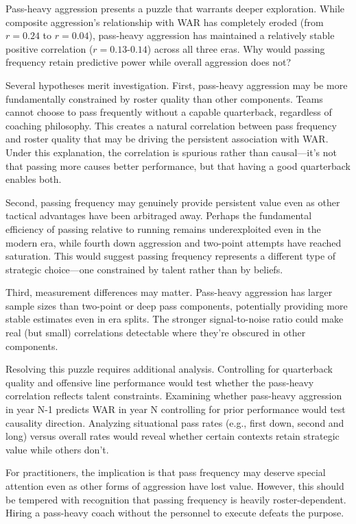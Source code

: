 \documentclass[11pt,twocolumn]{article}
\begin{document}
Pass-heavy aggression presents a puzzle that warrants deeper exploration. While composite aggression's relationship with WAR has completely eroded (from $r=0.24$ to $r=0.04$), pass-heavy aggression has maintained a relatively stable positive correlation ($r=0.13$-$0.14$) across all three eras. Why would passing frequency retain predictive power while overall aggression does not?

Several hypotheses merit investigation. First, pass-heavy aggression may be more fundamentally constrained by roster quality than other components. Teams cannot choose to pass frequently without a capable quarterback, regardless of coaching philosophy. This creates a natural correlation between pass frequency and roster quality that may be driving the persistent association with WAR. Under this explanation, the correlation is spurious rather than causal---it's not that passing more causes better performance, but that having a good quarterback enables both.

Second, passing frequency may genuinely provide persistent value even as other tactical advantages have been arbitraged away. Perhaps the fundamental efficiency of passing relative to running remains underexploited even in the modern era, while fourth down aggression and two-point attempts have reached saturation. This would suggest passing frequency represents a different type of strategic choice---one constrained by talent rather than by beliefs.

Third, measurement differences may matter. Pass-heavy aggression has larger sample sizes than two-point or deep pass components, potentially providing more stable estimates even in era splits. The stronger signal-to-noise ratio could make real (but small) correlations detectable where they're obscured in other components.

Resolving this puzzle requires additional analysis. Controlling for quarterback quality and offensive line performance would test whether the pass-heavy correlation reflects talent constraints. Examining whether pass-heavy aggression in year N-1 predicts WAR in year N controlling for prior performance would test causality direction. Analyzing situational pass rates (e.g., first down, second and long) versus overall rates would reveal whether certain contexts retain strategic value while others don't.

For practitioners, the implication is that pass frequency may deserve special attention even as other forms of aggression have lost value. However, this should be tempered with recognition that passing frequency is heavily roster-dependent. Hiring a pass-heavy coach without the personnel to execute defeats the purpose.
\end{document}
